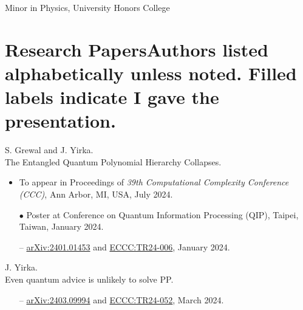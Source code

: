 \documentclass[11pt,letterpaper,serif]{moderncv}
\newcommand{\pubItemSep}{0em}
\begin{document}
\vspace{-\parsep}
{%
}
{
	\begin{adjustwidth}{.25in}{}
		Minor in Physics, University Honors College
	\end{adjustwidth}
}

\section{Research Papers\hfill{\footnotesize \normalfont Authors listed alphabetically unless noted. Filled labels indicate I gave the presentation.}}

S. Grewal and J. Yirka.
\\The Entangled Quantum Polynomial Hierarchy Collapses.
\begin{adjustwidth}{.1in}{}
	\begin{itemize}[itemsep=\pubItemSep]
		\item To appear in Proceedings of \textit{39th Computational Complexity Conference (CCC)}, Ann Arbor, MI, USA, July 2024.
		\item[$\bullet$] Poster at Conference on Quantum Information Processing (QIP), Taipei, Taiwan, January 2024.
		\item[--] \href{https://arxiv.org/abs/2401.01453}{arXiv:2401.01453} and \href{https://eccc.weizmann.ac.il/report/2024/006/}{ECCC:TR24-006}, January 2024.
	\end{itemize}
\end{adjustwidth}
\vspace{\parsep}

J. Yirka.
\\Even quantum advice is unlikely to solve \textup{PP}.
\begin{adjustwidth}{.1in}{}
	\begin{itemize}[itemsep=\pubItemSep]
		\item[--] \href{https://arxiv.org/abs/2403.09994}{arXiv:2403.09994} and \href{https://eccc.weizmann.ac.il/report/2024/052/}{ECCC:TR24-052}, March 2024.
	\end{itemize}
\end{adjustwidth}
\vspace{\parsep}
\end{document}
